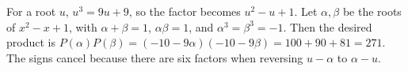 For a root $u$, $u^3=9u+9$, so the factor becomes $u^2-u+1$. Let $\alpha,\beta$ be the roots of $x^2-x+1$, with $\alpha+\beta=1$, $\alpha\beta=1$, and $\alpha^3=\beta^3=-1$. Then the desired product is $P(\alpha)P(\beta)=(-10-9\alpha)(-10-9\beta)=100+90+81=\boxed{271}$. The signs cancel because there are six factors when reversing $u-\alpha$ to $\alpha-u$.
